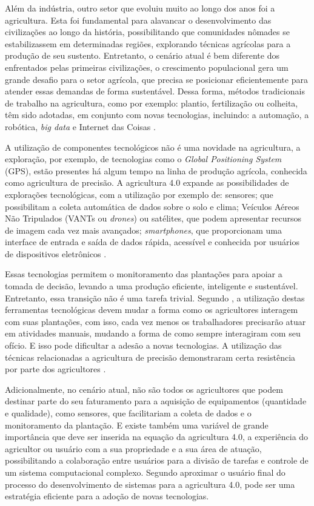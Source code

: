\documentclass[12pt]{article}
\begin{document}
Além da indústria, outro setor que evoluiu muito ao longo dos anos foi a agricultura. Esta foi fundamental para alavancar o desenvolvimento das civilizações ao longo da história, possibilitando que comunidades nômades se estabilizassem em determinadas regiões, explorando técnicas agrícolas para a produção de seu sustento. Entretanto, o cenário atual é bem diferente dos enfrentados pelas primeiras civilizações, o crescimento populacional gera um grande desafio para o setor agrícola, que precisa se posicionar eficientemente para atender essas demandas de forma sustentável. Dessa forma, métodos tradicionais de trabalho na agricultura, como por exemplo: plantio, fertilização ou colheita, têm sido adotadas, em conjunto com novas tecnologias, incluindo: a automação, a robótica, \textit{big data} e Internet das Coisas \cite{Ribeiro:2018}.

A utilização de componentes tecnológicos não é uma novidade na agricultura, a exploração, por exemplo, de tecnologias como o \textit{Global Positioning System} (GPS), estão presentes há algum tempo na linha de produção agrícola, conhecida como agricultura de precisão. A agricultura 4.0 expande as possibilidades de explorações tecnológicas, com a utilização por exemplo de: sensores; que possibilitam a coleta automática de dados sobre o solo e clima; Veículos Aéreos Não Tripulados (VANTs ou \textit{drones}) ou satélites, que podem apresentar recursos de imagem cada vez mais avançados; \textit{smartphones}, que proporcionam uma interface de entrada e saída de dados rápida, acessível e conhecida por usuários de dispositivos eletrônicos \cite{Shepherd:2018}. 

Essas tecnologias permitem o monitoramento das plantações para apoiar a tomada de decisão, levando a uma produção eficiente, inteligente e sustentável. Entretanto, essa transição não é uma tarefa trivial. Segundo , a utilização destas ferramentas tecnológicas devem mudar a forma como os agricultores interagem com suas plantações, com isso, cada vez menos os trabalhadores precisarão atuar em atividades manuais, mudando a forma de como sempre interagiram com seu ofício. E isso pode dificultar a adesão a novas tecnologias. A utilização das técnicas relacionadas a agricultura de precisão demonstraram certa resistência por parte dos agricultores \cite{Rose:2019}. 

Adicionalmente, no cenário atual, não são todos os agricultores que podem destinar parte do seu faturamento para a aquisição de equipamentos (quantidade e qualidade), como sensores, que facilitariam a coleta de dados e o monitoramento da plantação. E existe também uma variável de grande importância que deve ser inserida na equação da agricultura 4.0, a experiência do agricultor ou usuário com a sua propriedade e a sua área de atuação, possibilitando a colaboração entre usuários para a divisão de tarefas e controle de um sistema computacional complexo. Segundo  aproximar o usuário final do processo do desenvolvimento de sistemas para a agricultura 4.0, pode ser uma estratégia eficiente para a adoção de novas tecnologias.
\end{document}
